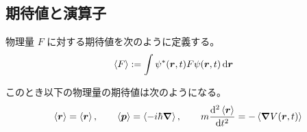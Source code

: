 \documentclass[uplatex,dvipdfmx,a4paper,11pt]{jlreq}
\newcommand{\rr}{\bm{r}}
\newcommand{\pp}{\bm{p}}
\numberwithin{equation}{section}
\theoremstyle{definition}
\begin{document}
\subsection{期待値と演算子}
\begin{definition}
  物理量 $F$ に対する期待値を次のように定義する。
  \begin{align}
    \ev{F} & := \int\psi^*(\rr, t)F\psi(\rr, t)\dd{\rr}
  \end{align}
\end{definition}
\begin{theorem}
  このとき以下の物理量の期待値は次のようになる。
  \begin{align}
    \ev{\rr} = \ev{\rr}, \qquad \ev{\pp} = \ev{-i\hbar\vnabla}, \qquad m\dv[2]{\ev{\rr}}{t} = - \ev{\vnabla V(\rr, t)}
  \end{align}
\end{theorem}
\end{document}
